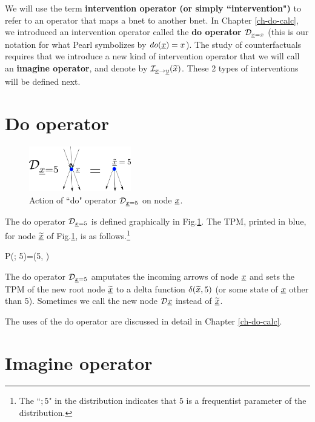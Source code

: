 We will use the
term {\bf intervention operator (or simply ``intervention")}
to refer to an operator
that maps a bnet to another bnet.
In Chapter \ref{ch-do-calc},
we introduced an intervention operator
 called the {\bf do operator}
${\cal D}_{{\underline{x}}=x}$ (this is our notation for what Pearl
symbolizes by $do({\underline{x}})=x$).
The study of counterfactuals
requires that we
introduce a new
kind of intervention
operator that we will
call an {\bf imagine operator},
and denote by ${\cal I}_{{\underline{x}}\rightarrow{\underline{y}}}(\widetilde{x})$.
These 2 types of interventions
will be defined
next.

\section{Do operator}


\begin{figure}[h!]
\centering
\includegraphics[width=1.75in]
{counterf/rho-op.png}
\caption{Action
of ``do" operator ${\cal D}_{{\underline{x}}=5}$
on node ${\underline{x}}$.}
\label{fig-rho-op}
\end{figure}

The do operator ${\cal D}_{{\underline{x}}=5}$
is defined graphically in Fig.\ref{fig-rho-op}.
The TPM, printed in blue,
 for node $\widetilde{{\underline{x}}}$ of Fig.\ref{fig-rho-op},
is as follows.\footnote{The ``$;5$" 
in the distribution
indicates that $5$ 
is a frequentist parameter of the distribution.}

\beq\color{blue}
P(; 5)=\delta(5, )
\eeq


The do operator ${\cal D}_{{\underline{x}}=5}$
amputates
the incoming arrows of node ${\underline{x}}$
and sets the TPM
of the new root node $\widetilde{{\underline{x}}}$
to a delta function $\delta(
\widetilde{x}, 5)$
(or some state of ${\underline{x}}$
 other than 5).
Sometimes we call the new node
${\cal D}{\underline{x}}$
instead of
$\widetilde{{\underline{x}}}$.

The uses of the do operator are discussed
in detail in Chapter \ref{ch-do-calc}.

\section{Imagine operator}

